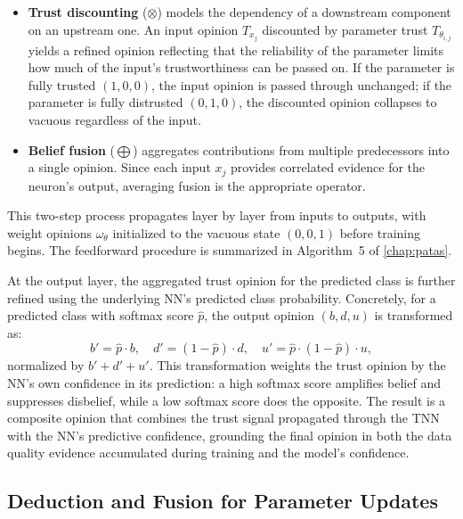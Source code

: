\begin{itemize}
    \item \textbf{Trust discounting} ($\otimes$) models the dependency of a downstream component on an upstream one. An input opinion $T_{x_j}$ discounted by parameter trust $T_{\theta_{i,j}}$ yields a refined opinion reflecting that the reliability of the parameter limits how much of the input's trustworthiness can be passed on. If the parameter is fully trusted $(1,0,0)$, the input opinion is passed through unchanged; if the parameter is fully distrusted $(0,1,0)$, the discounted opinion collapses to vacuous regardless of the input.
    \item \textbf{Belief fusion} ($\bigoplus$) aggregates contributions from multiple predecessors into a single opinion. Since each input $x_j$ provides correlated evidence for the neuron's output, averaging fusion is the appropriate operator.
\end{itemize}

This two-step process propagates layer by layer from inputs to outputs, with weight opinions $\omega_\theta$ initialized to the vacuous state $(0, 0, 1)$ before training begins. The feedforward procedure is summarized in Algorithm~5 of \cref{chap:patas}.

At the output layer, the aggregated trust opinion for the predicted class is further refined using the underlying \ac{NN}'s predicted class probability. Concretely, for a predicted class with softmax score $\hat{p}$, the output opinion $(b, d, u)$ is transformed as:
\begin{equation}
b' = \hat{p} \cdot b, \quad
d' = (1 - \hat{p}) \cdot d, \quad
u' = \hat{p} \cdot (1 - \hat{p}) \cdot u,
\label{eq:bdu_nnscore}
\end{equation}
normalized by $b' + d' + u'$. This transformation weights the trust opinion by the \ac{NN}'s own confidence in its prediction: a high softmax score amplifies belief and suppresses disbelief, while a low softmax score does the opposite. The result is a composite opinion that combines the trust signal propagated through the \ac{TNN} with the \ac{NN}'s predictive confidence, grounding the final opinion in both the data quality evidence accumulated during training and the model's confidence.

\subsection{Deduction and Fusion for Parameter Updates}
\label{sec:deduction_fusion}

